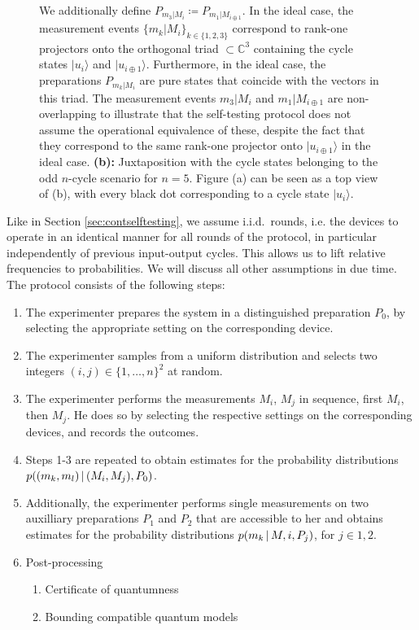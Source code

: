\begin{figure}
{\vspace*{0.7em} 
We additionally define $P_{m_3\vert M_i}\coloneqq P_{m_1\vert M_{i\oplus 1}}$. In the ideal case, the measurement events $\{m_k\vert M_i\}_{k\in\{1,2,3\}}$ correspond to rank-one projectors onto the orthogonal triad $\subset \mathbb{C}^3$ containing the cycle states $\vert u_i\rangle$ and $\vert u_{i\oplus 1}\rangle$. Furthermore, in the ideal case, the preparations $P_{m_k\vert M_i}$ are pure states that coincide with the vectors in this triad. The measurement events $m_3\vert M_i$ and $m_1\vert M_{i\oplus 1}$ are non-overlapping to illustrate that the self-testing protocol does not assume the operational equivalence of these, despite the fact that they correspond to the same rank-one projector onto $\vert u_{i\oplus 1}\rangle$ in the ideal case. \textbf{(b):} Juxtaposition with the cycle states belonging to the odd $n$-cycle scenario for $n=5$. Figure (a) can be seen as a top view of (b), with every black dot corresponding to a cycle state $\vert u_i\rangle$.
}
\label{fig:ncycleselftesting}
\end{figure}

Like in Section \ref{sec:contselftesting}, we assume i.i.d.\ rounds, i.e. the devices to operate in an identical manner for all rounds of the protocol, in particular independently of previous input-output cycles. This allows us to lift relative frequencies to probabilities. We will discuss all other assumptions in due time. The protocol consists of the following steps:
\begin{enumerate}
\item The experimenter prepares the system in a distinguished preparation $P_0$, by selecting the appropriate setting on the corresponding device.
\item The experimenter samples from a uniform distribution and selects two integers $(i,j)\in\{1,\dots,n\}^2$ at random.
\item The experimenter performs the measurements $M_i$, $M_j$ in sequence, first $M_i$, then $M_j$. He does so by selecting the respective settings on the corresponding devices, and records the outcomes.
\item Steps 1-3 are repeated to obtain estimates for the probability distributions \\ $p((m_k,m_l)\thinspace\vert\thinspace (M_i,M_j),P_0)$. 
\item Additionally, the experimenter performs single measurements on two auxilliary preparations $P_1$ and $P_2$ that are accessible to her and obtains estimates for the probability distributions $p(m_k\thinspace\vert\thinspace M,i, P_j)$, for $j\in{1,2}$.
\item Post-processing
	\begin{enumerate}
	\item Certificate of quantumness
	\item Bounding compatible quantum models
	\end{enumerate}
\end{enumerate}

